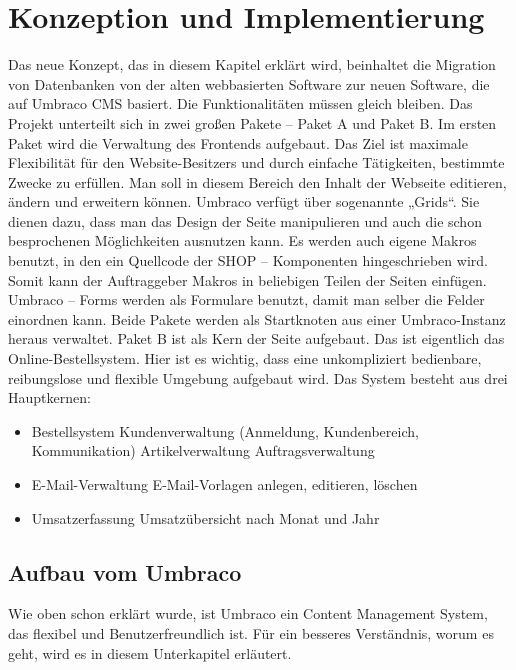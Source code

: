 \chapter{Konzeption und Implementierung}

Das neue Konzept, das in diesem Kapitel erklärt wird, beinhaltet die Migration von Datenbanken von der alten webbasierten Software zur neuen Software, die auf Umbraco CMS basiert. Die Funktionalitäten müssen gleich bleiben.  
Das Projekt unterteilt sich in zwei großen Pakete – Paket A und Paket B.
Im ersten Paket wird die Verwaltung des Frontends aufgebaut. Das Ziel ist maximale Flexibilität für den Website-Besitzers und durch einfache Tätigkeiten, bestimmte Zwecke zu erfüllen. Man soll in diesem Bereich den Inhalt der Webseite editieren, ändern und erweitern können. 
Umbraco verfügt über sogenannte „Grids“. Sie dienen dazu, dass man das Design der Seite manipulieren und auch die schon besprochenen Möglichkeiten ausnutzen kann. 
Es werden auch eigene Makros benutzt, in den ein Quellcode der SHOP – Komponenten hingeschrieben wird. Somit kann der Auftraggeber Makros in beliebigen Teilen der Seiten einfügen. Umbraco – Forms werden als Formulare benutzt, damit man selber die Felder einordnen kann.
Beide Pakete werden als Startknoten aus einer Umbraco-Instanz heraus verwaltet. 
Paket B ist als Kern der Seite aufgebaut. Das ist eigentlich das Online-Bestellsystem. Hier ist es wichtig, dass eine unkompliziert bedienbare, reibungslose und flexible Umgebung aufgebaut wird. Das System besteht aus drei Hauptkernen:
 
\begin{itemize}	
	\item Bestellsystem
	\subitem Kundenverwaltung (Anmeldung, Kundenbereich, Kommunikation)
	\subitem Artikelverwaltung
	\subitem Auftragsverwaltung
	\item E-Mail-Verwaltung
	\subitem E-Mail-Vorlagen anlegen, editieren, löschen
	\item Umsatzerfassung
	\subitem Umsatzübersicht nach Monat und Jahr
\end{itemize}

\section{Aufbau vom Umbraco}

Wie oben schon erklärt wurde, ist Umbraco \cite{Wahlberg2011} ein Content Management System, das flexibel und Benutzerfreundlich ist. Für ein besseres Verständnis, worum es geht, wird es in diesem Unterkapitel erläutert. 

